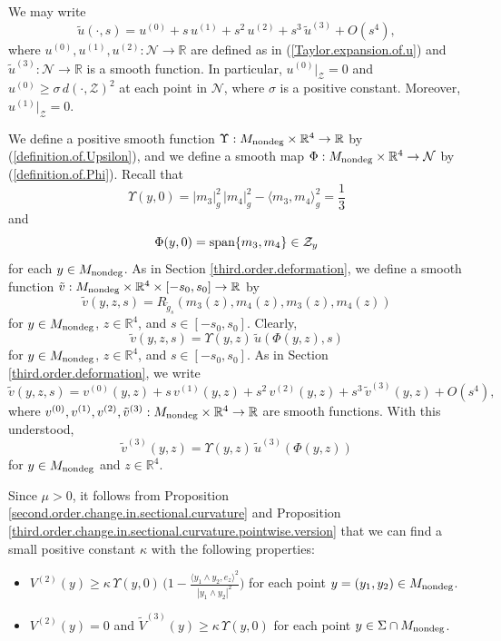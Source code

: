 \documentclass[11pt]{amsart}
\theoremstyle{definition}
\begin{document}
We may write 
\[\tilde{u}(\cdot,s) = u^{(0)} + s \, u^{(1)} + s^2 \, u^{(2)} + s^3 \, \tilde{u}^{(3)} + O(s^4),\]
where $u^{(0)},u^{(1)},u^{(2)}: \mathcal{N} \to \mathbb{R}$ are defined as in (\ref{Taylor.expansion.of.u}) and $\tilde{u}^{(3)}: \mathcal{N} \to \mathbb{R}$ is a smooth function. In particular, $u^{(0)}|_{\mathcal{Z}} = 0$ and $u^{(0)} \geq \sigma \, d(\cdot,\mathcal{Z})^2$ at each point in $\mathcal{N}$, where $\sigma$ is a positive constant. Moreover, $u^{(1)}|_{\mathcal{Z}} = 0$.

We define a positive smooth function $\Upsilon: M_{\text{\rm nondeg}} \times \mathbb{R}^4 \to \mathbb{R}$ by (\ref{definition.of.Upsilon}), and we define a smooth map $\Phi: M_{\text{\rm nondeg}} \times \mathbb{R}^4 \to \mathcal{N}$ by (\ref{definition.of.Phi}). Recall that 
\[\Upsilon(y,0) = |m_3|_g^2 \, |m_4|_g^2 - \langle m_3,m_4 \rangle_g^2 = \frac{1}{3}\] 
and 
\[\Phi(y,0) = \text{\rm span}\{m_3,m_4\} \in \mathcal{Z}_y\] 
for each $y \in M_{\text{\rm nondeg}}$. As in Section \ref{third.order.deformation}, we define a smooth function $\tilde{v}: M_{\text{\rm nondeg}} \times \mathbb{R}^4 \times [-s_0,s_0] \to \mathbb{R}$ by 
\[\tilde{v}(y,z,s) = R_{\tilde{g}_s}(m_3(z),m_4(z),m_3(z),m_4(z))\] 
for $y \in M_{\text{\rm nondeg}}$, $z \in \mathbb{R}^4$, and $s \in [-s_0,s_0]$. Clearly, 
\[\tilde{v}(y,z,s) = \Upsilon(y,z) \, \tilde{u}(\Phi(y,z),s)\]
for $y \in M_{\text{\rm nondeg}}$, $z \in \mathbb{R}^4$, and $s \in [-s_0,s_0]$. As in Section \ref{third.order.deformation}, we write 
\[\tilde{v}(y,z,s) = v^{(0)}(y,z) + s \, v^{(1)}(y,z) + s^2 \, v^{(2)}(y,z) + s^3 \, \tilde{v}^{(3)}(y,z) + O(s^4),\] 
where $v^{(0)},v^{(1)},v^{(2)},\tilde{v}^{(3)}: M_{\text{\rm nondeg}} \times \mathbb{R}^4 \to \mathbb{R}$ are smooth functions. With this understood,  
\[\tilde{v}^{(3)}(y,z) = \Upsilon(y,z) \, \tilde{u}^{(3)}(\Phi(y,z))\] 
for $y \in M_{\text{\rm nondeg}}$ and $z \in \mathbb{R}^4$.

Since $\mu > 0$, it follows from Proposition \ref{second.order.change.in.sectional.curvature} and Proposition \ref{third.order.change.in.sectional.curvature.pointwise.version} that we can find a small positive constant $\kappa$ with the following properties:
\begin{itemize} 
\item $V^{(2)}(y) \geq \kappa \, \Upsilon(y,0) \, \big ( 1 - \frac{\langle y_1 \wedge y_2,e_z \rangle^2}{|y_1 \wedge y_2|^2} \big )$ for each point $y = (y_1,y_2) \in M_{\text{\rm nondeg}}$. 
\item $V^{(2)}(y) = 0$ and $\tilde{V}^{(3)}(y) \geq \kappa \, \Upsilon(y,0)$ for each point $y \in \Sigma \cap M_{\text{\rm nondeg}}$. 
\end{itemize}
\end{document}
